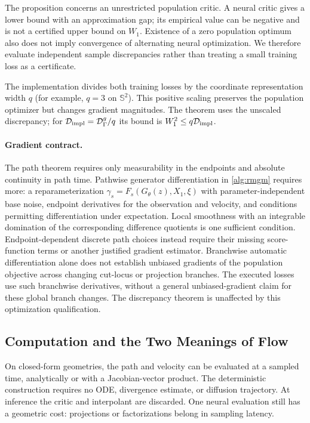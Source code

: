 The proposition concerns an unrestricted population critic. A neural critic gives a lower bound with an approximation gap; its empirical value can be negative and is not a certified upper bound on $W_1$. Existence of a zero population optimum also does not imply convergence of alternating neural optimization. We therefore evaluate independent sample discrepancies rather than treating a small training loss as a certificate.

The implementation divides both training losses by the coordinate representation width $q$ (for example, $q=3$ on $\mathbb S^2$). This positive scaling preserves the population optimizer but changes gradient magnitudes. The theorem uses the unscaled discrepancy; for $\mathcal D_{\mathrm{impl}}=\mathcal D_\Gamma^g/q$ its bound is $W_1^2\leq q\mathcal D_{\mathrm{impl}}$.

\paragraph{Gradient contract.}
The path theorem requires only measurability in the endpoints and absolute continuity in path time. Pathwise generator differentiation in \cref{alg:rmgm} requires more: a reparameterization $\gamma_s=F_s(G_\theta(z),X_1,\xi)$ with parameter-independent base noise, endpoint derivatives for the observation and velocity, and conditions permitting differentiation under expectation. Local smoothness with an integrable domination of the corresponding difference quotients is one sufficient condition. Endpoint-dependent discrete path choices instead require their missing score-function terms or another justified gradient estimator. Branchwise automatic differentiation alone does not establish unbiased gradients of the population objective across changing cut-locus or projection branches. The executed losses use such branchwise derivatives, without a general unbiased-gradient claim for these global branch changes. The discrepancy theorem is unaffected by this optimization qualification.

\subsection{Computation and the Two Meanings of Flow}
\label{sec:wgf}
On closed-form geometries, the path and velocity can be evaluated at a sampled time, analytically or with a Jacobian-vector product. The deterministic construction requires no ODE, divergence estimate, or diffusion trajectory. At inference the critic and interpolant are discarded. One neural evaluation still has a geometric cost: projections or factorizations belong in sampling latency.


